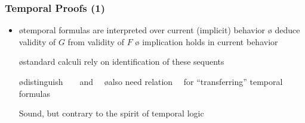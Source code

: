 \documentclass[fleqn]{beamer}
\begin{document}
\begin{frame}
  \frametitle{Temporal Proofs (1)}

  \begin{itemize}
  \item {}

    \begin{itemize}
    \o temporal formulas are interpreted over current (implicit) behavior
    \o {} 
       deduce validity of $G$ from validity of $F$
       \hfill
    \o {}
       implication holds in current behavior
       \unitlength 1mm
       \hfill

    \medskip

    \o standard calculi rely on identification of these sequents
    \end{itemize}


  \oo {}

    \begin{itemize}
    \o distinguish\ \ \ \ and\ \ 
    \o also need relation\ \ \tc{dkgreen}{$\sigma \sqsubseteq \tau$}
       for ``transferring'' temporal formulas
    \end{itemize}

  \oo \alert{Sound, but contrary to the spirit of temporal logic}
  \end{itemize}
\end{frame}
\end{document}
